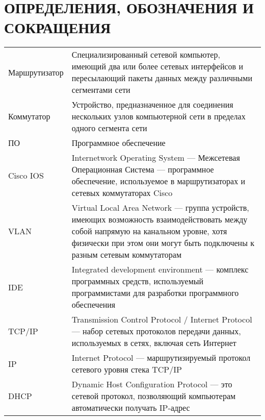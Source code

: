\chapter*{ОПРЕДЕЛЕНИЯ, ОБОЗНАЧЕНИЯ И СОКРАЩЕНИЯ}

\makeatletter
\setlength{\@fptop}{0pt}
\makeatother

\begin{table*}[ht!]
	\begin{tabular}{p{}p{}}
		Маршрутизатор & Специализированный сетевой компьютер, имеющий два или более сетевых интерфейсов и пересылающий пакеты данных между различными сегментами сети \\
		
		Коммутатор & Устройство, предназначенное для соединения нескольких узлов компьютерной сети в пределах одного сегмента сети\\

		ПО & Программное обеспечение\\
		
		Cisco IOS & Internetwork Operating System — Межсетевая Операционная Система --- программное обеспечение, используемое в маршрутизаторах и сетевых коммутаторах Cisco\\
		
		VLAN & Virtual Local Area Network --- группа устройств, имеющих возможность взаимодействовать между собой напрямую на канальном уровне, хотя физически при этом они могут быть подключены к разным сетевым коммутаторам\\
		
		IDE & Integrated development environment --- комплекс программных средств, используемый программистами для разработки программного обеспечения\\
		
		TCP/IP & Transmission Control Protocol / Internet Protocol --- набор сетевых протоколов передачи данных, используемых в сетях, включая сеть Интернет\\
		
		IP &  Internet Protocol --- маршрутизируемый протокол сетевого уровня стека TCP/IP\\
		
		DHCP & Dynamic Host Configuration Protocol --- это сетевой протокол, позволяющий компьютерам автоматически получать IP-адрес\\
		
		
		
	\end{tabular}
	
\end{table*}

